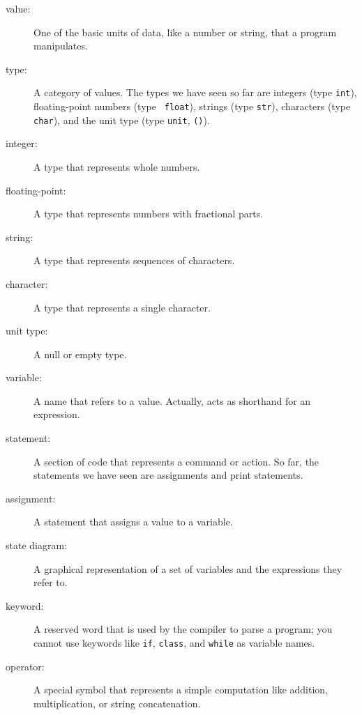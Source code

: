 \documentclass[10pt]{book}
\begin{document}
\begin{description}

\item[value:]  One of the basic units of data, like a number or string, 
that a program manipulates.

\item[type:] A category of values.  The types we have seen so far
are integers (type {\tt int}), floating-point numbers (type {\tt
float}), strings (type {\tt str}), characters (type {\tt char}), and 
the unit type (type {\tt unit}, {\tt ()}).

\item[integer:] A type that represents whole numbers.

\item[floating-point:] A type that represents numbers with fractional
parts.

\item[string:] A type that represents sequences of characters.

\item[character: ] A type that represents a single character.

\item[unit type: ] A null or empty type.

\item[variable:]  A name that refers to a value. Actually, acts as shorthand for an expression.

\item[statement:]  A section of code that represents a command or action.  So
far, the statements we have seen are assignments and print statements.

\item[assignment:]  A statement that assigns a value to a variable.

\item[state diagram:]  A graphical representation of a set of variables and the
expressions they refer to.

\item[keyword:]  A reserved word that is used by the compiler to parse a
program; you cannot use keywords like {\tt if}, {\tt  class}, and {\tt while} as
variable names.

\item[operator:]  A special symbol that represents a simple computation like
addition, multiplication, or string concatenation.


\end{description}
\end{document}
